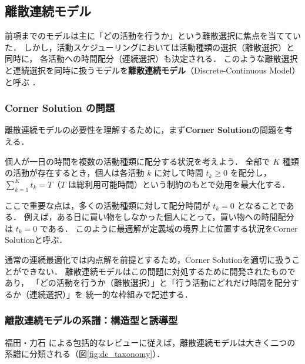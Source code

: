 \subsection{離散連続モデル}\label{ssec:discrete_continuous}

前項までのモデルは主に「どの活動を行うか」という離散選択に焦点を当てていた．
しかし，活動スケジューリングにおいては活動種類の選択（離散選択）と同時に，
各活動への時間配分（連続選択）も決定される．
このような離散選択と連続選択を同時に扱うモデルを\textbf{離散連続モデル}（Discrete-Continuous Model）と呼ぶ \cite{FukudaChikaraishi2013}．

\subsubsection{Corner Solution の問題}

離散連続モデルの必要性を理解するために，まず\textbf{Corner Solution}の問題を考える．

個人が一日の時間を複数の活動種類に配分する状況を考えよう．
全部で $K$ 種類の活動が存在するとき，個人は各活動 $k$ に対して時間 $t_k \ge 0$ を配分し，
$\sum_{k=1}^{K} t_k = T$（$T$ は総利用可能時間）という制約のもとで効用を最大化する．

ここで重要な点は，多くの活動種類に対して配分時間が $t_k = 0$ となることである．
例えば，ある日に買い物をしなかった個人にとって，買い物への時間配分は $t_k = 0$ である．
このように最適解が定義域の境界上に位置する状況をCorner Solutionと呼ぶ．

通常の連続最適化では内点解を前提とするため，Corner Solutionを適切に扱うことができない．
離散連続モデルはこの問題に対処するために開発されたものであり，
「どの活動を行うか（離散選択）」と「行う活動にどれだけ時間を配分するか（連続選択）」を
統一的な枠組みで記述する．

\subsubsection{離散連続モデルの系譜：構造型と誘導型}\label{sssec:dc_taxonomy}

福田・力石 \cite{FukudaChikaraishi2013} による包括的なレビューに従えば，離散連続モデルは大きく二つの系譜に分類される（図\ref{fig:dc_taxonomy}）．

